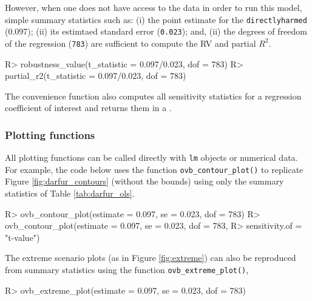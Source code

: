 \documentclass[
]{jss}
\begin{document}
\noindent However, when one does not have access to the data in order to
run this model, simple summary statistics such as: (i) the point
estimate for the \texttt{directlyharmed} (0.097); (ii) its estimtaed
standard error (\texttt{0.023}); and, (ii) the degrees of freedom of the
regression (\texttt{783}) are sufficient to compute the RV and partial
\(R^2\).

\begin{CodeChunk}

\begin{CodeInput}
R> robustness_value(t_statistic = 0.097/0.023, dof = 783)
R> partial_r2(t_statistic = 0.097/0.023, dof = 783)
\end{CodeInput}
\end{CodeChunk}

The convenience function  also computes all
sensitivity statistics for a regression coefficient of interest and
returns them in a .

\hypertarget{plotting-functions}{%
\subsubsection{Plotting functions}\label{plotting-functions}}

All plotting functions can be called directly with \texttt{lm} objects
or numerical data. For example, the code below uses the function
\texttt{ovb\_contour\_plot()} to replicate Figure
\ref{fig:darfur_contours} (without the bounds) using only the summary
statistics of Table \ref{tab:darfur_ols}.

\begin{CodeChunk}

\begin{CodeInput}
R> ovb_contour_plot(estimate = 0.097, se = 0.023, dof = 783)
R> ovb_contour_plot(estimate = 0.097, se = 0.023, dof = 783, 
R>                  sensitivity.of = "t-value")
\end{CodeInput}
\end{CodeChunk}

The extreme scenario plots (as in Figure \ref{fig:extreme}) can also be
reproduced from summary statistics using the function
\texttt{ovb\_extreme\_plot()},

\begin{CodeChunk}

\begin{CodeInput}
R> ovb_extreme_plot(estimate = 0.097, se = 0.023, dof = 783)
\end{CodeInput}
\end{CodeChunk}
\end{document}
